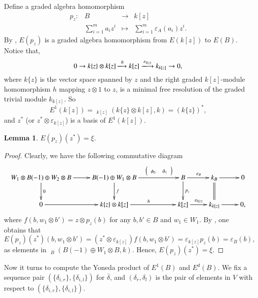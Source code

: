 \documentclass[a4paper,10pt]{amsart}
\newtheorem{lemma}[theorem]{Lemma}
\theoremstyle{definition}
\numberwithin{equation}{section}
\DeclareMathOperator{\uHom}{\underline{Hom}}
\begin{document}
Define a graded algebra homomorphism
$$
\begin{array}{cclc}
p_z:  &  B &\to &k[z]\\
~  &  \sum_{i=1}^m a_iz^i &\mapsto & \sum_{i=1}^m \varepsilon_A(a_i)z^i.
\end{array}
$$
By \cite[Theorem 1]{SWZ}, $E(p_z)$ is a graded algebra homomorphism from $E(k[z])$ to $E(B)$. Notice that,
$$
0\to
k\{z\}\otimes k[z]\xlongrightarrow{h}
k[z]\xlongrightarrow{\varepsilon_{k[z]}}
k_{k[z]}\to
0,
$$
where $k\{z\}$ is the vector space spanned by $z$ and the right graded $k[z]$-module homomorphism $h$ mapping $z\otimes 1$ to $z$, is a minimal free resolution of the graded trivial module $k_{k[z]}$. So
$$
E^{1}(k[z])=\uHom_{k[z]}(k\{z\}\otimes k[z],k)=(k\{z\})^*,
$$
and $z^*$ (or $z^*\otimes \varepsilon_{k[z]}$) is a basis of $E^1(k[z])$.

\begin{lemma}
$E(p_z)(z^*)=\xi$.
\end{lemma}
\begin{proof}Clearly, we have the following commutative diagram
$$
\xymatrix{
W_1\otimes B(-1)\oplus W_{2}\otimes B \ar[r]\ar[d]^{0}&
B(-1)\oplus W_1\otimes B\ar[rr]^(0.65){{\left(\begin{array}{ll}{\scriptstyle \phi_0}& {\scriptstyle \partial_1}\end{array}\right)}}
\ar[d]^{f}
&&
B\ar[r]^{\varepsilon_B}\ar[d]^{p_z}
&
k_B\ar[r]\ar@{=}[d]
&0
\\
0\ar[r]&
k\{z\}\otimes  k[z]\ar[rr]^{h}&&
k[z]\ar[r]^{\varepsilon_{k[z]}}
&
k_{k[z]}\ar[r]&
0,
}
$$
where $f(b,w_1\otimes b')=z\otimes p_z(b)$ for any $b,b'\in B$ and $w_1\in W_1$. By \cite[Theorem 1]{SWZ}, one obtains that
$$
E(p_z)(z^*)(b,w_1\otimes b')=(z^*\otimes\varepsilon_{k[z]})f(b,w_1\otimes b')=\varepsilon_{k[z]}p_z(b)=\varepsilon_{B}(b),
$$
as elements in $\uHom_{B}(B(-1)\oplus W_1\otimes B,k)$. Hence, $E(p_z)(z^*)=\xi$.
\end{proof}




Now it turns to compute the Yoneda product of $E^1(B)$ and $E^{d}(B)$. We fix a sequence pair $(\{\delta_{i,r}\},\{\delta_{i,l}\})$ for $\overline{\delta}$, and $(\delta_r,\delta_l)$ is the pair of elements in $V$ with respect to $(\{\delta_{i,r}\},\{\delta_{i,l}\})$.
\end{document}

